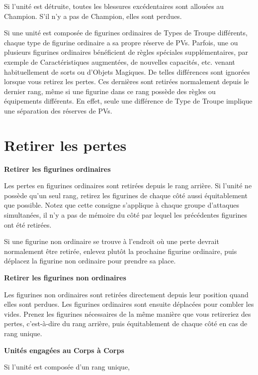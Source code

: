 Si l'unité est détruite, toutes les blessures excédentaires sont allouées au Champion. S'il n'y a pas de Champion, elles sont perdues.

Si une unité est composée de figurines ordinaires de Types de Troupe différents, chaque type de figurine ordinaire a sa propre réserve de PVs. Parfois, une ou plusieurs figurines ordinaires bénéficient de règles spéciales supplémentaires, par exemple de Caractéristiques augmentées, de nouvelles capacités, etc. venant habituellement de sorts ou d'Objets Magiques. De telles différences sont ignorées lorsque vous retirez les pertes. Ces dernières sont retirées normalement depuis le dernier rang, même si une figurine dans ce rang possède des règles ou équipements différents. En effet, seule une différence de Type de Troupe implique une séparation des réserves de PVs. 

\newpage
\section{Retirer les pertes}

\noindent\textbf{Retirer les figurines ordinaires}

Les pertes en figurines ordinaires sont retirées depuis le rang arrière. Si l'unité ne possède qu'un seul rang, retirez les figurines de chaque côté aussi équitablement que possible. Notez que cette consigne s'applique à chaque groupe d'attaques simultanées, il n'y a pas de \og mémoire \fg{} du côté par lequel les précédentes figurines ont été retirées.

Si une figurine non ordinaire se trouve à l'endroit où une perte devrait normalement être retirée, enlevez plutôt la prochaine figurine ordinaire, puis déplacez la figurine non ordinaire pour prendre sa place.

\noindent\textbf{Retirer les figurines non ordinaires}

Les figurines non ordinaires sont retirées directement depuis leur position quand elles sont perdues. Les figurines ordinaires sont ensuite déplacées pour combler les vides. Prenez les figurines nécessaires de la même manière que vous retireriez des pertes, c'est-à-dire du rang arrière, puis équitablement de chaque côté en cas de rang unique.

\noindent\textbf{Unités engagées au Corps à Corps}

Si l'unité est composée d'un rang unique, 

